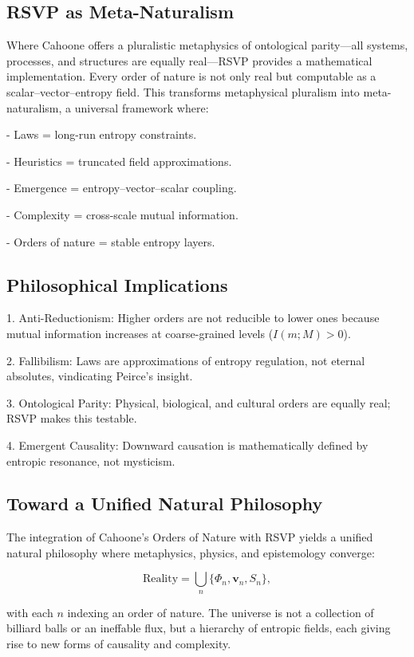 \documentclass[12pt]{book}
\begin{document}
\subsection{RSVP as Meta-Naturalism}
Where Cahoone offers a pluralistic metaphysics of ontological parity—all systems, processes, and structures are equally real—RSVP provides a mathematical implementation. Every order of nature is not only real but computable as a scalar–vector–entropy field. This transforms metaphysical pluralism into meta-naturalism, a universal framework where:

- Laws = long-run entropy constraints.

- Heuristics = truncated field approximations.

- Emergence = entropy–vector–scalar coupling.

- Complexity = cross-scale mutual information.

- Orders of nature = stable entropy layers.

\subsection{Philosophical Implications}
1. Anti-Reductionism: Higher orders are not reducible to lower ones because mutual information increases at coarse-grained levels (\( I(m;M) > 0 \)).

2. Fallibilism: Laws are approximations of entropy regulation, not eternal absolutes, vindicating Peirce’s insight.

3. Ontological Parity: Physical, biological, and cultural orders are equally real; RSVP makes this testable.

4. Emergent Causality: Downward causation is mathematically defined by entropic resonance, not mysticism.

\subsection{Toward a Unified Natural Philosophy}
The integration of Cahoone’s Orders of Nature with RSVP yields a unified natural philosophy where metaphysics, physics, and epistemology converge:

\[ \text{Reality} = \bigcup_{n} \{ \Phi_n, \mathbf{v}_n, S_n \}, \]

with each \( n \) indexing an order of nature. The universe is not a collection of billiard balls or an ineffable flux, but a hierarchy of entropic fields, each giving rise to new forms of causality and complexity.
\end{document}
